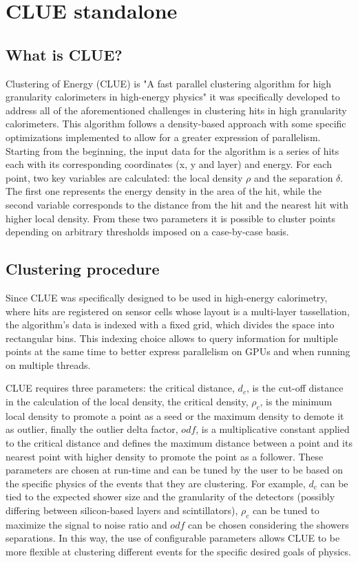 \section{CLUE standalone}
\subsection{What is CLUE?}
\label{ch:clue}
Clustering of Energy (CLUE) is "A fast parallel clustering algorithm for high granularity calorimeters in high-energy physics"\cite{CLUE} it was specifically developed to address all of the aforementioned challenges in clustering hits in high granularity calorimeters. This algorithm follows a density-based approach with some specific optimizations implemented to allow for a greater expression of parallelism. Starting from the beginning, the input data for the algorithm is a series of hits each with its corresponding coordinates (x, y and layer) and energy. For each point, two key variables are calculated: the local density $\rho$ and the separation $\delta$. The first one represents the energy density in the area of the hit, while the second variable corresponds to the distance from the hit and the nearest hit with higher local density. From these two parameters it is possible to cluster points depending on arbitrary thresholds imposed on a case-by-case basis. 

\subsection{Clustering procedure}
\label{ch:clustering_procedure}
Since CLUE was specifically designed to be used in high-energy calorimetry, where hits are registered on sensor cells whose layout is a multi-layer tassellation, the algorithm's data is indexed with a fixed grid, which divides the space into rectangular bins. This indexing choice allows to query information for multiple points at the same time to better express parallelism on GPUs and when running on multiple threads.

CLUE requires three parameters: the critical distance, $d_c$, is the cut-off distance in the calculation of the local density, the critical density, $\rho_c$, is the minimum local density to promote a point as a seed or the maximum density to demote it as outlier, finally the outlier delta factor, $odf$, is a multiplicative constant applied to the critical distance and defines the maximum distance between a point and its nearest point with higher density to promote the point as a follower. These parameters are chosen at run-time and can be tuned by the user to be based on the specific physics of the events that they are clustering. For example, $d_c$ can be tied to the expected shower size and the granularity of the detectors (possibly differing between silicon-based layers and scintillators), $\rho_c$ can be tuned to maximize the signal to noise ratio and $odf$ can be chosen considering the showers separations. In this way, the use of configurable parameters allows CLUE to be more flexible at clustering different events for the specific desired goals of physics. 


